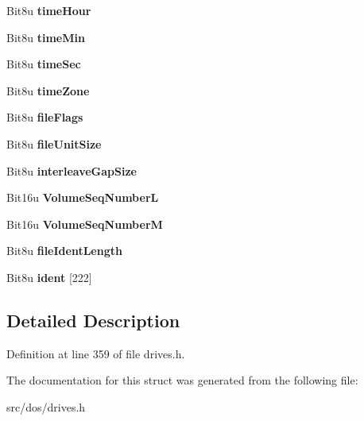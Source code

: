 \begin{DoxyCompactItemize}
\item 
\hypertarget{structisoDirEntry_ad5f7d5ba46e893d19ef699d39a44b875}{Bit8u {\bfseries time\-Hour}}\label{structisoDirEntry_ad5f7d5ba46e893d19ef699d39a44b875}

\item 
\hypertarget{structisoDirEntry_a8babe3c17f3931ffbe6cbba20cfb18b8}{Bit8u {\bfseries time\-Min}}\label{structisoDirEntry_a8babe3c17f3931ffbe6cbba20cfb18b8}

\item 
\hypertarget{structisoDirEntry_aeeda5230d96dd1fc08463136d84f673b}{Bit8u {\bfseries time\-Sec}}\label{structisoDirEntry_aeeda5230d96dd1fc08463136d84f673b}

\item 
\hypertarget{structisoDirEntry_a989029e709520fd23b8dbe878b66e729}{Bit8u {\bfseries time\-Zone}}\label{structisoDirEntry_a989029e709520fd23b8dbe878b66e729}

\item 
\hypertarget{structisoDirEntry_a6c73c88e3eb3329d826091048233e783}{Bit8u {\bfseries file\-Flags}}\label{structisoDirEntry_a6c73c88e3eb3329d826091048233e783}

\item 
\hypertarget{structisoDirEntry_a079492a83780a0316e44bc79b53102e1}{Bit8u {\bfseries file\-Unit\-Size}}\label{structisoDirEntry_a079492a83780a0316e44bc79b53102e1}

\item 
\hypertarget{structisoDirEntry_a6075892ffd1990542c8e68deb4621ddb}{Bit8u {\bfseries interleave\-Gap\-Size}}\label{structisoDirEntry_a6075892ffd1990542c8e68deb4621ddb}

\item 
\hypertarget{structisoDirEntry_ac4632844fa457e6a3efe05744db8e08e}{Bit16u {\bfseries Volume\-Seq\-Number\-L}}\label{structisoDirEntry_ac4632844fa457e6a3efe05744db8e08e}

\item 
\hypertarget{structisoDirEntry_a993c6f1d2836d163140d7c447da856ee}{Bit16u {\bfseries Volume\-Seq\-Number\-M}}\label{structisoDirEntry_a993c6f1d2836d163140d7c447da856ee}

\item 
\hypertarget{structisoDirEntry_a80c4c5121bb984a0d310d897f1cfaecb}{Bit8u {\bfseries file\-Ident\-Length}}\label{structisoDirEntry_a80c4c5121bb984a0d310d897f1cfaecb}

\item 
\hypertarget{structisoDirEntry_adcd0165ef3a6a392c001c2c3d0326b98}{Bit8u {\bfseries ident} \mbox{[}222\mbox{]}}\label{structisoDirEntry_adcd0165ef3a6a392c001c2c3d0326b98}

\end{DoxyCompactItemize}


\subsection{Detailed Description}


Definition at line 359 of file drives.\-h.



The documentation for this struct was generated from the following file\-:\begin{DoxyCompactItemize}
\item 
src/dos/drives.\-h\end{DoxyCompactItemize}
